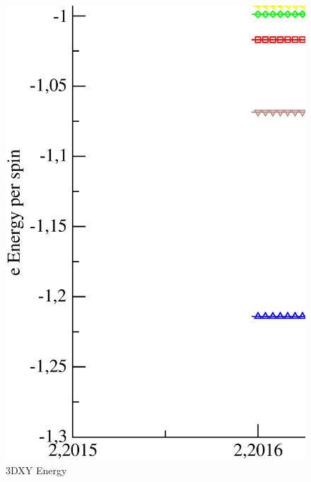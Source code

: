 \begin{figure}[!htpb]
  \centering
  \includegraphics[width=\textwidth]{./plots/3DXY/vsT/Energy.eps}
  \caption{3DXY Energy}
\end{figure}


